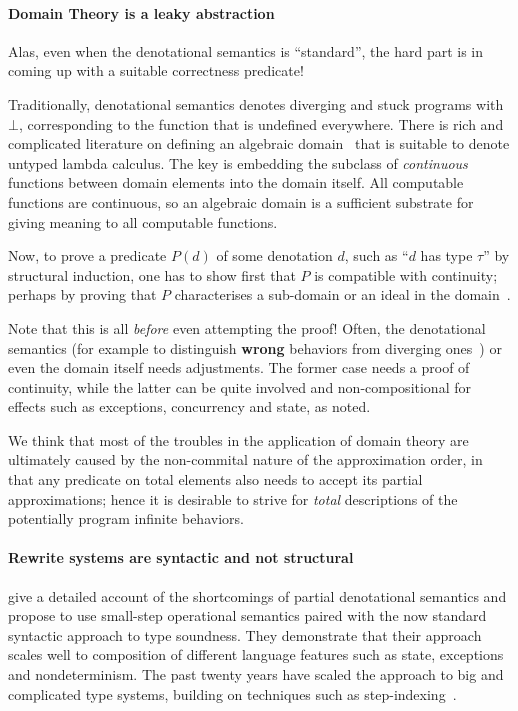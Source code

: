 \paragraph{Domain Theory is a leaky abstraction}
Alas, even when the denotational semantics is ``standard'', the hard part is in
coming up with a suitable correctness predicate!

Traditionally, denotational semantics denotes diverging and stuck programs with
$\bot$, corresponding to the function that is undefined everywhere.
There is rich and complicated literature on defining an algebraic
domain~\cite{Scott:71} that is suitable to denote untyped lambda calculus.
The key is embedding the subclass of \emph{continuous} functions between domain
elements into the domain itself. All computable functions are continuous,
so an algebraic domain is a sufficient substrate for giving meaning to all
computable functions.

Now, to prove a predicate $P(d)$ of some denotation $d$, such as ``$d$ has type
$τ$'' by structural induction, one has to show first that $P$ is compatible
with continuity; perhaps by proving that $P$ characterises a sub-domain or an
ideal in the domain~\cite{Milner:78}.

Note that this is all \emph{before} even attempting the proof! Often, the
denotational semantics (for example to distinguish \textbf{wrong} behaviors from
diverging ones~\cite{Milner:78}) or even the domain itself needs adjustments.
The former case needs a proof of continuity, while the latter can be quite
involved and non-compositional for effects such as exceptions, concurrency and
state, as \citep{WrightFelleisen:94} noted.

We think that most of the troubles in the application of domain theory are
ultimately caused by the non-commital nature of the approximation order, in that
any predicate on total elements also needs to accept its partial approximations;
hence it is desirable to strive for \emph{total} descriptions of the potentially
program infinite behaviors.

\paragraph{Rewrite systems are syntactic and not structural}
\citep{WrightFelleisen:94} give a detailed account of the shortcomings of
partial denotational semantics and propose to use small-step operational
semantics paired with the now standard syntactic approach to type soundness.
They demonstrate that their approach scales well to composition of different
language features such as state, exceptions and nondeterminism. The past
twenty years have scaled the approach to big and complicated type systems,
building on techniques such as step-indexing~\cite{TODO}.

